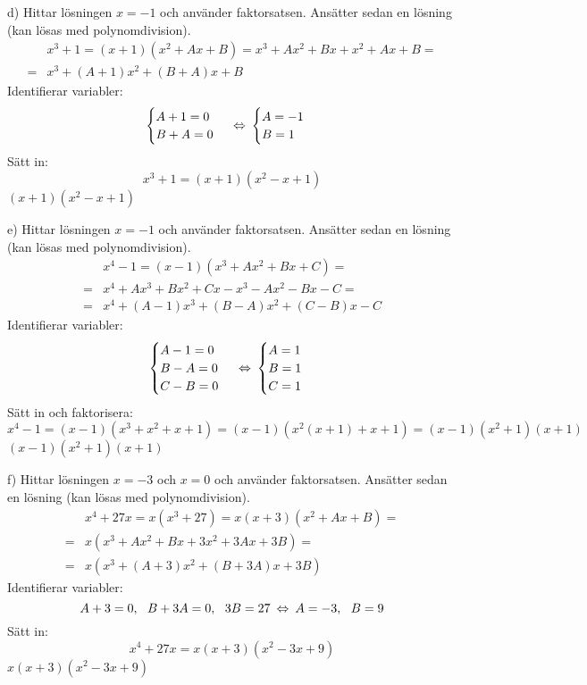 \begin{task}{d)}
	Hittar lösningen $x=-1$ och använder faktorsatsen. Ansätter sedan en lösning (kan lösas med polynomdivision).
	\begin{align*}
	&x^3+1=(x+1)(x^2+Ax+B)=x^3+Ax^2+Bx+x^2+Ax+B= \\ =
	&x^3+(A+1)x^2+(B+A)x+B
	\end{align*}
	Identifierar variabler:
	\[\begin{cases}
	A+1=0 \\
	B+A=0
	\end{cases}
	\lra
	\begin{cases}
	A=-1 \\
	B=1
	\end{cases}\]
	Sätt in:
	\[x^3+1=(x+1)(x^2-x+1)\]
	\ans $(x+1)(x^2-x+1)$
\end{task}

\begin{task}{e)}
	Hittar lösningen $x=-1$ och använder faktorsatsen. Ansätter sedan en lösning (kan lösas med polynomdivision).
	\begin{align*}
	&x^4-1=(x-1)(x^3+Ax^2+Bx+C)= \\ =
	&x^4+Ax^3+Bx^2+Cx-x^3-Ax^2-Bx-C= \\ =
	&x^4+(A-1)x^3+(B-A)x^2+(C-B)x-C
	\end{align*}
	Identifierar variabler:
	\[\begin{cases}
	A-1=0 \\
	B-A=0 \\
	C-B=0
	\end{cases}
	\lra
	\begin{cases}
	A=1 \\
	B=1 \\
	C=1
	\end{cases}\]
	Sätt in och faktorisera:
	\[x^4-1=(x-1)(x^3+x^2+x+1)=(x-1)(x^2(x+1)+x+1)=(x-1)(x^2+1)(x+1)\]
	\ans $(x-1)(x^2+1)(x+1)$
\end{task}

\begin{task}{f)}
	Hittar lösningen $x=-3$ och $x=0$ och använder faktorsatsen. Ansätter sedan en lösning (kan lösas med polynomdivision).
	\begin{align*}
	&x^4+27x=x(x^3+27)=x(x+3)(x^2+Ax+B)= \\ =
	&x(x^3+Ax^2+Bx+3x^2+3Ax+3B)= \\ =
	&x(x^3+(A+3)x^2+(B+3A)x+3B)
	\end{align*}
	Identifierar variabler:
	\[A+3=0,~~B+3A=0,~~3B=27 \lra A=-3,~~B=9\]
	Sätt in:
	\[x^4+27x=x(x+3)(x^2-3x+9)\]
	\ans $x(x+3)(x^2-3x+9)$
\end{task}


